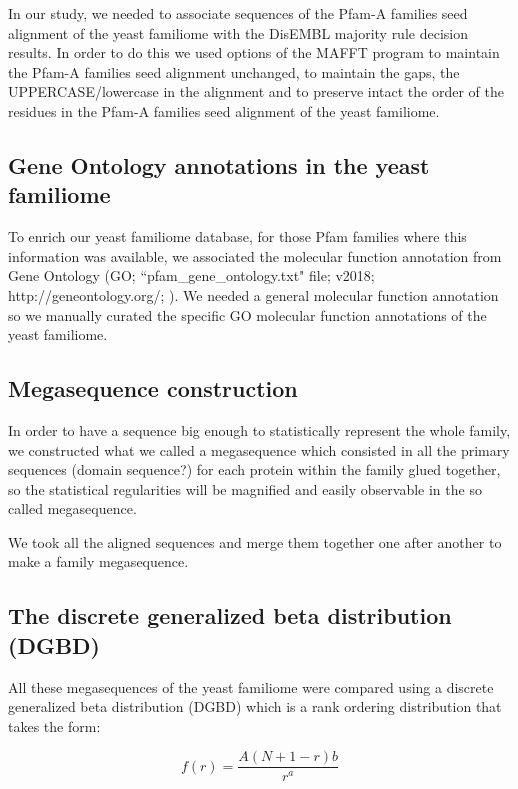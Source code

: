 \documentclass[preprint,12pt]{elsarticle}
\begin{document}
In our study, we needed to associate sequences of the Pfam-A families seed alignment of the yeast familiome with the DisEMBL majority rule decision results. In order to do this we used options of the MAFFT program to maintain the Pfam-A families seed alignment unchanged, to maintain the gaps, the UPPERCASE/lowercase in the alignment and to preserve intact the order of the residues \cite{katoh2012adding} \cite{katoh2012adding} in the Pfam-A families seed alignment of the yeast familiome. 


\subsection{Gene Ontology annotations in the yeast familiome}

To enrich our yeast familiome database, for those Pfam families where this information was available, we associated the molecular function annotation from Gene Ontology (GO; ``pfam\_gene\_ontology.txt" file; v2018; http://geneontology.org/; \cite{ashburner2000gene} \cite{gene2015gene}). We needed a general molecular function annotation so we manually curated the specific GO molecular function annotations of the yeast familiome. 


\subsection{Megasequence construction}
In order to have a sequence big enough to statistically represent the whole family, we constructed what we called a megasequence which consisted in all the primary sequences (domain sequence?) for each protein within the family glued together, so the statistical regularities will be magnified and easily observable in the so called megasequence.

We took all the aligned sequences and merge them together one after another to make a family megasequence.

\subsection{The discrete generalized beta distribution (DGBD)}

All these megasequences of the yeast familiome were compared using a discrete generalized beta distribution (DGBD) \cite{martinez2009universality} \cite{petersen2011statistical} which is a rank ordering distribution that takes the form:

\begin{equation}
f(r) = \dfrac{A(N+1-r)b}{r^a}  
\end{equation}
\end{document}
